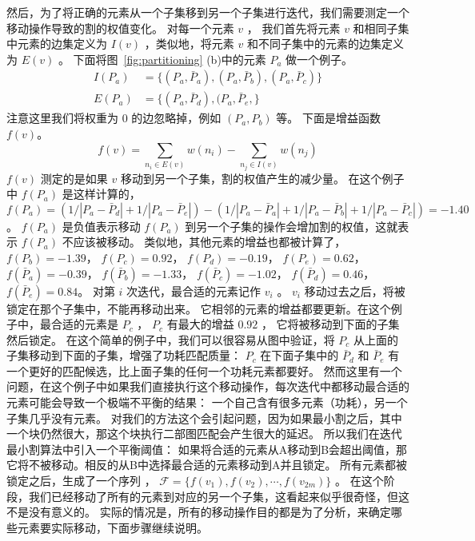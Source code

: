   然后，为了将正确的元素从一个子集移到另一个子集进行迭代，我们需要测定一个移动操作导致的割的权值变化。
  对每一个元素 $v$ ， 我们首先将元素 $v$ 和相同子集中元素的边集定义为 $I(v)$ ，类似地，将元素 $v$ 和不同子集中的元素的边集定义为 $E(v)$ 。
  下面将图~\ref{fig:partitioning} (b)中的元素 $P_a$ 做一个例子。
  \begin{equation}
  \begin{split}
  I(P_a) &= \{(P_a,\bar{P}_a), (P_a, \bar{P}_b), (P_a, \bar{P}_c)\}\\
  E(P_a) &= \{(P_a, \bar{P}_d), (P_a, \bar{P}_e, \}
  \end{split}
  \end{equation}
  注意这里我们将权重为 $0$ 的边忽略掉，例如 $(P_a, P_b)$ 等。
  下面是增益函数 $f(v)$。
  \begin{equation}
  f(v) = \sum_{n_i \in E(v)}{w(n_i )} - \sum_{n_j \in I(v)}{w(n_j )}
  \end{equation}
  $f(v)$ 测定的是如果 $v$ 移动到另一个子集，割的权值产生的减少量。
  在这个例子中 $f(P_a)$ 是这样计算的， $f(P_a) =
  (1/|P_a-\bar{P}_d|+1/|P_a-\bar{P}_e|)-(1/|P_a-\bar{P}_a|+1/|P_a-\bar{P}_b|+1/|P_a-\bar{P}_c|)=-1.40$。
  $f(P_a)$ 是负值表示移动 $f(P_a)$ 到另一个子集的操作会增加割的权值，这就表示 $f(P_a)$ 不应该被移动。
  类似地，其他元素的增益也都被计算了， $f(P_b)=-1.39$， $f(P_c) = 0.92$， $f(P_d) = -0.19$，
  $f(P_e)=0.62$， $f(\bar{P}_a) = -0.39$， $f(\bar{P}_b)=-1.33$，
  $f(\bar{P}_c)=-1.02$， $f(\bar{P}_d) = 0.46$， $f(\bar{P}_e) = 0.84$。
  对第 $i$ 次迭代，最合适的元素记作 $v_i$ 。  $v_i$ 移动过去之后，将被锁定在那个子集中，不能再移动出来。
  它相邻的元素的增益都要更新。在这个例子中，最合适的元素是 $P_c$ ， $P_c$ 有最大的增益 $0.92$ ，
  它将被移动到下面的子集然后锁定。
  在这个简单的例子中，我们可以很容易从图中验证，将 $P_c$ 从上面的子集移动到下面的子集，增强了功耗匹配质量：
$P_c$ 在下面子集中的 $\bar{P}_d$ 和 $\bar{P}_e$ 有一个更好的匹配候选，比上面子集的任何一个功耗元素都要好。
然而这里有一个问题，在这个例子中如果我们直接执行这个移动操作，每次迭代中都移动最合适的元素可能会导致一个极端不平衡的结果：
一个自己含有很多元素（功耗），另一个子集几乎没有元素。
对我们的方法这个会引起问题，因为如果最小割之后，其中一个块仍然很大，那这个块执行二部图匹配会产生很大的延迟。
所以我们在迭代最小割算法中引入一个平衡阈值：
如果将合适的元素从A移动到B会超出阈值，那它将不被移动。相反的从B中选择最合适的元素移动到A并且锁定。
所有元素都被锁定之后，生成了一个序列 ， $\mathcal{F} = \{f(v_1), f(v_2), \cdots, f(v_{2m})\}$ 。
在这个阶段，我们已经移动了所有的元素到对应的另一个子集，这看起来似乎很奇怪，但这不是没有意义的。
实际的情况是，所有的移动操作目的都是为了分析，来确定哪些元素要实际移动，下面步骤继续说明。

